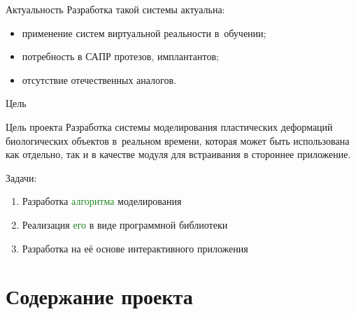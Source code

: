 \documentclass[usenames,dvipsnames,pdftex,unicode,hidelinks]{beamer}
\begin{document}
  \begin{frame}{Актуальность}
    Разработка такой системы актуальна:
    \begin{itemize}
      \item применение систем виртуальной реальности в~обучении;
      \item потребность в САПР протезов, имплантантов;
      \item отсутствие отечественных аналогов.
    \end{itemize}

    \vspace{0.5cm}
    
  \end{frame}

  \begin{frame}{Цель}
    \begin{block}{Цель проекта}
      Разработка \alert{системы моделирования} пластических деформаций биологических объектов
      \alert{в~реальном времени}, которая может быть использована как отдельно, так и в качестве
      \alert{модуля} для встраивания в стороннее приложение.
    \end{block}

    \vspace{0.5cm}

    Задачи:
    \begin{enumerate}
      \item Разработка \textcolor{ForestGreen}{алгоритма} моделирования
      \item Реализация \textcolor{ForestGreen}{его} в виде \textcolor{RoyalPurple}{программной библиотеки}
      \item Разработка на \textcolor{RoyalPurple}{её} основе \textcolor{NavyBlue}{интерактивного приложения}
    \end{enumerate}
  \end{frame}

  \section{Содержание проекта}
\end{document}
